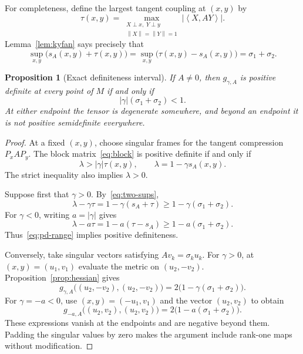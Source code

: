 \documentclass[11pt]{amsart}
\newtheorem{proposition}[theorem]{Proposition}
\theoremstyle{definition}
\theoremstyle{remark}
\newcommand{\ip}[2]{\left\langle #1,#2\right\rangle}
\newcommand{\norm}[1]{\left\lVert #1\right\rVert}
\begin{document}
For completeness, define the largest tangent coupling at $(x,y)$ by
\begin{equation}\label{eq:tau}
 \tau(x,y)=
 \max_{\substack{X\perp x,\;Y\perp y\\
                  \norm{X}=\norm{Y}=1}}
 \left|\ip{X}{AY}\right|.
\end{equation}
Lemma~\ref{lem:kyfan} says precisely that
\begin{equation}\label{eq:two-sups}
 \sup_{x,y}\big(s_A(x,y)+\tau(x,y)\big)
 =\sup_{x,y}\big(\tau(x,y)-s_A(x,y)\big)
 =\sigma_1+\sigma_2.
\end{equation}

\begin{proposition}[Exact definiteness interval]\label{prop:positive}
If $A\neq0$, then $g_{\gamma,A}$ is positive definite at every point
of $M$ if and only if
\begin{equation}\label{eq:pd-range}
 |\gamma|(\sigma_1+\sigma_2)<1.
\end{equation}
At either endpoint the tensor is degenerate somewhere, and beyond an
endpoint it is not positive semidefinite everywhere.
\end{proposition}

\begin{proof}
At a fixed $(x,y)$, choose singular frames for the tangent compression
$P_xAP_y$.  The block matrix~\eqref{eq:block} is positive definite if
and only if
\begin{equation}\label{eq:pointwise-pd}
 \lambda>|\gamma|\tau(x,y),
 \qquad \lambda=1-\gamma s_A(x,y).
\end{equation}
The strict inequality also implies $\lambda>0$.

Suppose first that $\gamma>0$.  By~\eqref{eq:two-sups},
\[
 \lambda-\gamma\tau
 =1-\gamma(s_A+\tau)
 \geq1-\gamma(\sigma_1+\sigma_2).
\]
For $\gamma<0$, writing $a=|\gamma|$ gives
\[
 \lambda-a\tau
 =1-a(\tau-s_A)
 \geq1-a(\sigma_1+\sigma_2).
\]
Thus~\eqref{eq:pd-range} implies positive definiteness.

Conversely, take singular vectors satisfying
$Av_k=\sigma_k u_k$.  For $\gamma>0$, at $(x,y)=(u_1,v_1)$ evaluate
the metric on $(u_2,-v_2)$.  Proposition~\ref{prop:hessian} gives
\begin{equation}\label{eq:failure-plus}
 g_{\gamma,A}\big((u_2,-v_2),(u_2,-v_2)\big)
 =2\big(1-\gamma(\sigma_1+\sigma_2)\big).
\end{equation}
For $\gamma=-a<0$, use $(x,y)=(-u_1,v_1)$ and the vector
$(u_2,v_2)$ to obtain
\begin{equation}\label{eq:failure-minus}
 g_{-a,A}\big((u_2,v_2),(u_2,v_2)\big)
 =2\big(1-a(\sigma_1+\sigma_2)\big).
\end{equation}
These expressions vanish at the endpoints and are negative beyond
them.  Padding the singular values by zero makes the argument include
rank-one maps without modification.
\end{proof}
\end{document}
